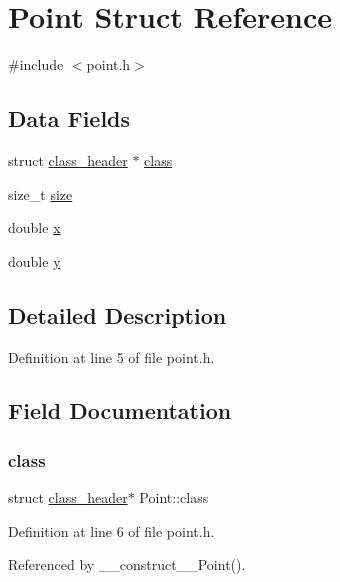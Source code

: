 \hypertarget{structPoint}{}\section{Point Struct Reference}
\label{structPoint}


{\ttfamily \#include $<$point.\+h$>$}

\subsection*{Data Fields}
\begin{DoxyCompactItemize}
\item 
struct \mbox{\hyperlink{structclass__header}{class\+\_\+header}} $\ast$ \mbox{\hyperlink{structPoint_a5c33b351426ea2f85e8bcd748a287055}{class}}
\item 
size\+\_\+t \mbox{\hyperlink{structPoint_af3ba5fb6c2b53483ccf31342a19ad6ae}{size}}
\item 
double \mbox{\hyperlink{structPoint_ab99c56589bc8ad5fa5071387110a5bc7}{x}}
\item 
double \mbox{\hyperlink{structPoint_afa38be143ae800e6ad69ce8ed4df62d8}{y}}
\end{DoxyCompactItemize}


\subsection{Detailed Description}


Definition at line 5 of file point.\+h.



\subsection{Field Documentation}
\mbox{\label{structPoint_a5c33b351426ea2f85e8bcd748a287055}} 
\subsubsection{\texorpdfstring{class}{class}}
{\footnotesize\ttfamily struct \mbox{\hyperlink{structclass__header}{class\+\_\+header}}$\ast$ Point\+::class}



Definition at line 6 of file point.\+h.



Referenced by \+\_\+\+\_\+construct\+\_\+\+\_\+\+Point().

